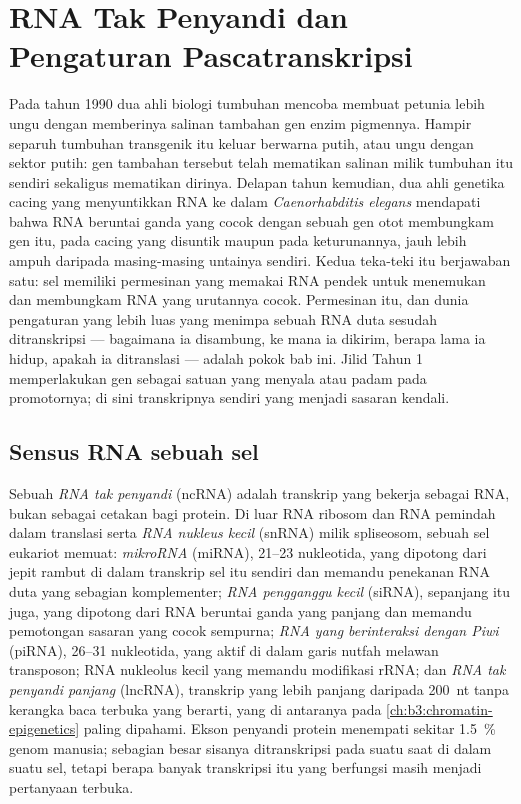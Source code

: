 \chapter{RNA Tak Penyandi dan Pengaturan Pascatranskripsi}\label{ch:b3:rna-regulation}

Pada tahun 1990 dua ahli biologi tumbuhan mencoba membuat petunia lebih ungu
dengan memberinya salinan tambahan gen enzim pigmennya. Hampir separuh
tumbuhan transgenik itu keluar berwarna putih, atau ungu dengan sektor putih:
gen tambahan tersebut telah mematikan salinan milik tumbuhan itu sendiri
sekaligus mematikan dirinya. Delapan tahun kemudian, dua ahli genetika cacing
yang menyuntikkan RNA ke dalam \emph{Caenorhabditis elegans} mendapati bahwa
RNA beruntai ganda yang cocok dengan sebuah gen otot membungkam gen itu, pada
cacing yang disuntik maupun pada keturunannya, jauh lebih ampuh daripada
masing-masing untainya sendiri. Kedua teka-teki itu berjawaban satu: sel
memiliki permesinan yang memakai RNA pendek untuk menemukan dan membungkam
RNA yang urutannya cocok. Permesinan itu, dan dunia pengaturan yang lebih
luas yang menimpa sebuah RNA duta sesudah ditranskripsi --- bagaimana ia
disambung, ke mana ia dikirim, berapa lama ia hidup, apakah ia
ditranslasi --- adalah pokok bab ini. Jilid Tahun 1 memperlakukan gen sebagai
satuan yang menyala atau padam pada promotornya; di sini transkripnya sendiri
yang menjadi sasaran kendali.

\section{Sensus RNA sebuah sel}

\begin{definition}\label{def:b3:rna-regulation:ncrna}
%
Sebuah \emph{RNA tak penyandi} (ncRNA) adalah transkrip yang bekerja sebagai
RNA, bukan sebagai cetakan bagi protein. Di luar RNA ribosom dan RNA pemindah
dalam translasi serta \emph{RNA nukleus kecil} (snRNA) milik spliseosom,
sebuah sel eukariot memuat: \emph{mikroRNA} (miRNA), \numrange{21}{23}
nukleotida, yang dipotong dari jepit rambut di dalam transkrip sel itu sendiri
dan memandu penekanan RNA duta yang sebagian komplementer; \emph{RNA
pengganggu kecil} (siRNA), sepanjang itu juga, yang dipotong dari RNA beruntai
ganda yang panjang dan memandu pemotongan sasaran yang cocok sempurna;
\emph{RNA yang berinteraksi dengan Piwi} (piRNA), \numrange{26}{31}
nukleotida, yang aktif di dalam garis nutfah melawan transposon; RNA nukleolus
kecil yang memandu modifikasi rRNA; dan \emph{RNA tak penyandi panjang}
(lncRNA), transkrip yang lebih panjang daripada \qty{200}{nt} tanpa kerangka
baca terbuka yang berarti, yang di antaranya \emph{} pada
\cref{ch:b3:chromatin-epigenetics} paling dipahami. Ekson penyandi protein
menempati sekitar \qty{1.5}{\%} genom manusia; sebagian besar sisanya
ditranskripsi pada suatu saat di dalam suatu sel, tetapi berapa banyak
transkripsi itu yang berfungsi masih menjadi pertanyaan terbuka.
\end{definition}

